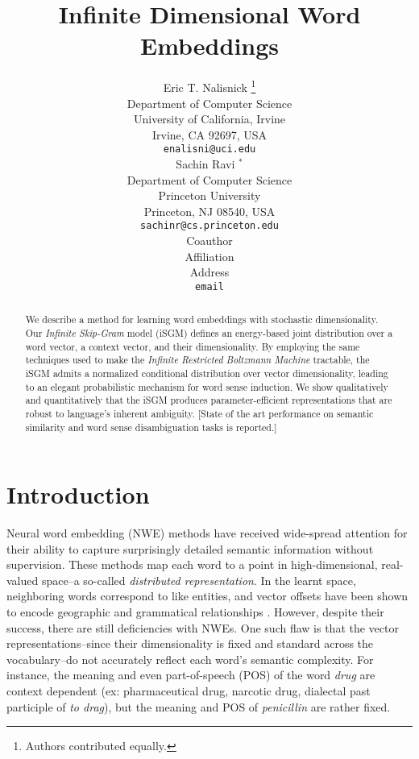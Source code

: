 \documentclass{article} %
\title{Infinite Dimensional Word Embeddings}
\author{Eric T. Nalisnick \thanks{ Authors contributed equally.} \\
Department of Computer Science\\
University of California, Irvine\\
Irvine, CA 92697, USA \\
\texttt{enalisni@uci.edu} \\
\And
Sachin Ravi $^{*}$\\
Department of Computer Science \\
Princeton University \\
Princeton, NJ 08540, USA \\
\texttt{sachinr@cs.princeton.edu} \\
\AND
Coauthor \\
Affiliation \\
Address \\
\texttt{email}
}
\begin{document}
\maketitle

\begin{abstract}
We describe a method for learning word embeddings with stochastic dimensionality.  Our \textit{Infinite Skip-Gram} model (iSGM) defines an energy-based joint distribution over a word vector, a context vector, and their dimensionality.  By employing the same techniques used to make the \textit{Infinite Restricted Boltzmann Machine} \citep{cote2015infinite} tractable, the iSGM admits a normalized conditional distribution over vector dimensionality, leading to an elegant probabilistic mechanism for word sense induction.  We show qualitatively and quantitatively that the iSGM produces parameter-efficient representations that are robust to language's inherent ambiguity.  [State of the art performance on semantic similarity and word sense disambiguation tasks is reported.]  
\end{abstract}

\section{Introduction}
Neural word embedding (NWE) methods \citep{mnih2009scalable, turian2010word, mikolov2013distributed} have received wide-spread attention for their ability to capture surprisingly detailed semantic information without supervision.  These methods map each word to a point in high-dimensional, real-valued space--a so-called \textit{distributed representation}.  In the learnt space, neighboring words correspond to like entities, and vector offsets have been shown to encode geographic and grammatical relationships \citep{mikolov2013linguistic}.  However, despite their success, there are still deficiencies with NWEs.  One such flaw is that the vector representations--since their dimensionality is fixed and standard across the vocabulary--do not accurately reflect each word's semantic complexity.  For instance, the meaning and even part-of-speech (POS) of  the word \textit{drug} are context dependent (ex: pharmaceutical drug, narcotic drug, dialectal past participle of \textit{to drag}), but the meaning and POS of \textit{penicillin} are rather fixed.
\end{document}
